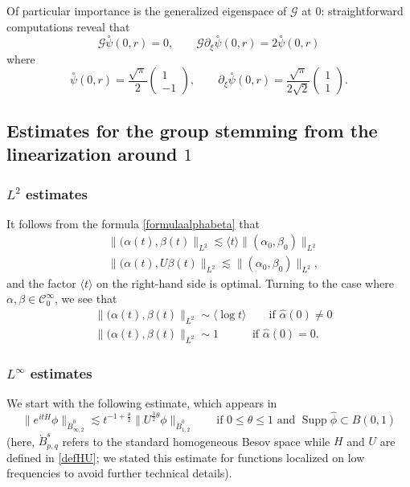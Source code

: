 \documentclass[11 pt]{amsart}
\theoremstyle{definition}
\theoremstyle{remark}
\numberwithin{equation}{section}
\begin{document}
Of particular importance is the generalized eigenspace of $\mathcal{G}$ at 0: straightforward computations reveal that
$$
\mathcal{G} \overset{\circ}{\psi}(0,r) = 0, \qquad \mathcal{G} \partial_\xi \overset{\circ}{\psi}(0,r) = 2 \overset{\circ}{\psi}(0,r)
$$
where
$$
\overset{\circ}{\psi}(0,r) = \frac{\sqrt{\pi}}{2} \begin{pmatrix}  1 \\ -1 \end{pmatrix}, \qquad \partial_\xi \overset{\circ}{\psi}(0,r) = \frac{\sqrt{\pi}}{2\sqrt 2} \begin{pmatrix}  1 \\ 1 \end{pmatrix}.
$$


\subsection{Estimates for the group stemming from the linearization around $1$} 

\subsubsection{$L^2$ estimates} It follows from the formula \eqref{formulaalphabeta} that
\begin{align*}
& \| (\alpha(t),\beta(t) \|_{L^2} \lesssim \langle t \rangle \| (\alpha_0,\beta_0) \|_{L^2} \\
& \| (\alpha(t), U \beta(t) \|_{L^2} \lesssim \| (\alpha_0,\beta_0 ) \|_{L^2},
\end{align*}
and the factor $\langle t \rangle$ on the right-hand side is optimal.
Turning to the case where $\alpha,\beta \in \mathcal{C}_0^\infty$, we see that
\begin{align*}
& \| (\alpha(t),\beta(t) \|_{L^2} \sim \langle \log t \rangle \qquad \mbox{if $\widehat{\alpha}(0) \neq 0$} \\
& \| (\alpha(t),\beta(t) \|_{L^2} \sim 1  \quad \qquad \mbox{if $\widehat{\alpha}(0) = 0$}.
\end{align*}

\subsubsection{$L^\infty$ estimates} We start with the following estimate, which appears in \cite{GustafsonNakanishiTsai3}
\begin{equation}
\label{estimateGNT}
\| e^{itH} \phi \|_{\dot{B}^0_{\infty,2}} \lesssim t^{-1 + \frac{\theta}{2}} \| U^{\frac{3}{2}\theta} \phi \|_{\dot{B}_{1,2}^0} \qquad \mbox{if $0\leq \theta \leq 1$ and $\operatorname{Supp} \widehat{\phi} \subset B(0,1)$} 
\end{equation}
(here, $\dot{B}^s_{p,q}$ refers to the standard homogeneous Besov space while $H$ and $U$ are defined in \eqref{defHU}; we stated this estimate for functions localized on low frequencies to avoid further technical details).
\end{document}
